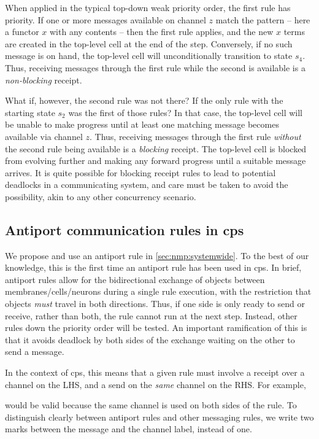 When applied in the typical top-down weak priority order, the first rule has priority.  If one or more messages available on channel \(z\) match the pattern -- here a functor \(x\) with any contents -- then the first rule applies, and the new \(x\) terms are created in the top-level cell at the end of the step.  Conversely, if no such message is on hand, the top-level cell will unconditionally transition to state \(s_4\).  Thus, receiving messages through the first rule while the second is available is a \emph{non-blocking} receipt.

What if, however, the second rule was not there? If the only rule with the starting state \(s_2\) was the first of those rules?  In that case, the top-level cell will be unable to make progress until at least one matching message becomes available via channel \(z\).  Thus, receiving messages through the first rule \emph{without} the second rule being available is a \emph{blocking} receipt.  The top-level cell is blocked from evolving further and making any forward progress until a suitable message arrives.  It is quite possible for blocking receipt rules to lead to potential deadlocks in a communicating system, and care must be taken to avoid the possibility, akin to any other concurrency scenario.

\subsection{\label{sec:nmp:antiport}Antiport communication rules in \texorpdfstring{\gls{cps}}{cP systems}}

We propose and use an antiport rule \cite{Orellana-Martin2019,Paun2002} in \cref{sec:nmp:systemwide}.  To the best of our knowledge, this is the first time an antiport rule has been used in \gls{cps}.  In brief, antiport rules allow for the bidirectional exchange of objects between membranes/cells/neurons during a single rule execution, with the restriction that objects \emph{must} travel in both directions.  Thus, if one side is only ready to send or receive, rather than both, the rule cannot run at the next step.  Instead, other rules down the priority order will be tested.  An important ramification of this is that it avoids deadlock by both sides of the exchange waiting on the other to send a message.

In the context of \gls{cps}, this means that a given rule must involve a receipt over a channel on the LHS, and a send on the \emph{same} channel on the RHS.  For example,
\begin{framed}
\vspace{-1.0cm}
\vspace{-0.7cm}
\end{framed}\noindent
would be valid because the same channel is used on both sides of the rule.  To distinguish clearly between antiport rules and other messaging rules, we write two marks between the message and the channel label, instead of one.